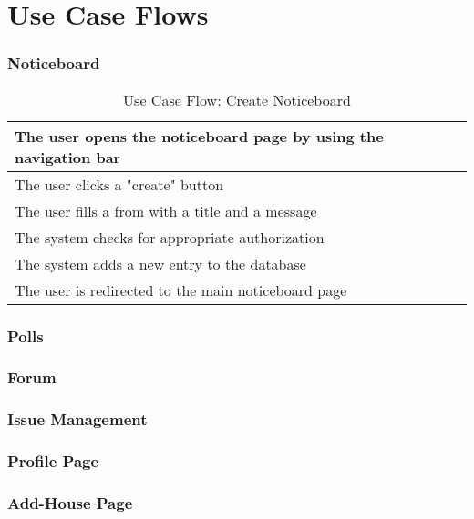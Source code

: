\chapter{Use Case Flows} \label{ch:flows}
\subsection{Noticeboard}
\begin{table}[H]
    \begin{tabularx}{\linewidth}{|X|}
      \hline
       The user opens the noticeboard page by using the navigation bar \\
       \hline
       The user clicks a "create" button \\
       \hline
       The user fills a from with a title and a message \\
       \hline
       The system checks for appropriate authorization \\
       \hline
       The system adds a new entry to the database \\
       \hline
       The user is redirected to the main noticeboard page \\
       \hline 
    \end{tabularx}
    \caption{Use Case Flow: Create Noticeboard}
  \end{table}


\subsection{Polls}

\subsection{Forum}

\subsection{Issue Management}

\subsection{Profile Page}

\subsection{Add-House Page}
